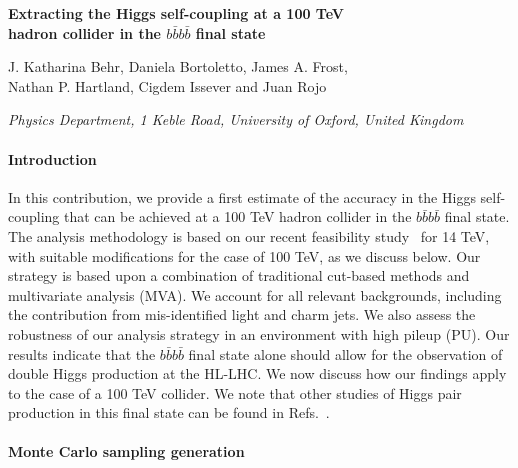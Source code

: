 \documentclass[a4paper,11pt]{article}
\begin{document}
\begin{center}
  {\Large \bf Extracting the Higgs self-coupling at a 100 TeV\\[0.2cm] hadron
  collider in the $b\bar{b}b\bar{b}$ final state}
\vspace{.7cm}

J. Katharina Behr, Daniela Bortoletto, James A. Frost,\\
  Nathan P. Hartland, Cigdem Issever and Juan Rojo


\vspace{.3cm}
{\it Physics Department, 1 Keble Road, University of Oxford, United Kingdom }

\end{center}
\vspace{1cm}


\paragraph{Introduction}

In this contribution, we provide a first estimate of the accuracy
in the Higgs self-coupling that can be achieved at a 100 TeV
hadron collider in the  $b\bar{b}b\bar{b}$ final state.
%
The analysis methodology is based on our recent feasibility
study~\cite{Behr:2015oqq}
for 14 TeV, with suitable modifications for the case of 100 TeV,
as we discuss below.
%
 Our strategy is based upon a combination of traditional cut-based
 methods and multivariate analysis (MVA).
  We account for  all relevant
  backgrounds, including the contribution from mis-identified
  light and charm jets.
  We also assess the robustness of our analysis strategy in
  an environment with high pileup (PU).
 Our results indicate that 
  the $b\bar{b}b\bar{b}$ 
final state
alone should allow for the observation of double Higgs production
  at the HL-LHC.
  We now discuss how our findings apply to the case of a 100
  TeV collider.
  We note that other studies of Higgs pair production in this
final state can be found in Refs.~\cite{Wardrope:2014kya,deLima:2014dta}.

\paragraph{Monte Carlo sampling generation}
\end{document}
